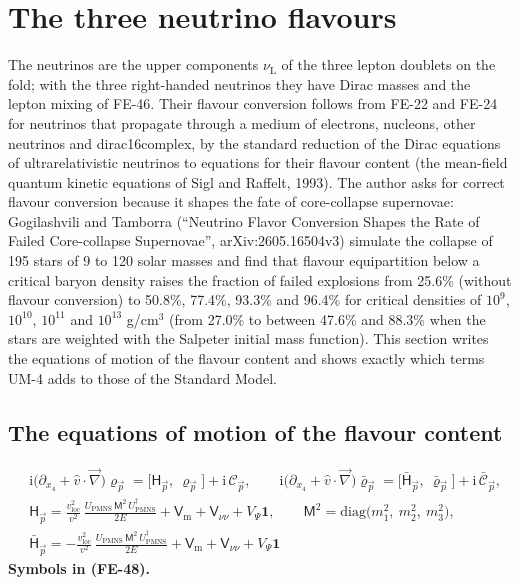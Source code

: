 \documentclass[
  10pt,
]{article}
\begin{document}
\hypertarget{the-three-neutrino-flavours}{%
\section{The three neutrino
flavours}\label{the-three-neutrino-flavours}}

The neutrinos are the upper components \(\nu_{\mathrm{L}}\) of the three
lepton doublets on the fold; with the three right-handed neutrinos they
have Dirac masses and the lepton mixing of FE-46. Their flavour
conversion follows from FE-22 and FE-24 for neutrinos that propagate
through a medium of electrons, nucleons, other neutrinos and
dirac16complex, by the standard reduction of the Dirac equations of
ultrarelativistic neutrinos to equations for their flavour content (the
mean-field quantum kinetic equations of Sigl and Raffelt, 1993). The
author asks for correct flavour conversion because it shapes the fate of
core-collapse supernovae: Gogilashvili and Tamborra (``Neutrino Flavor
Conversion Shapes the Rate of Failed Core-collapse Supernovae'',
arXiv:2605.16504v3) simulate the collapse of 195 stars of 9 to 120 solar
masses and find that flavour equipartition below a critical baryon
density raises the fraction of failed explosions from 25.6\% (without
flavour conversion) to 50.8\%, 77.4\%, 93.3\% and 96.4\% for critical
densities of \(10^9\), \(10^{10}\), \(10^{11}\) and \(10^{13}\)
g/cm\(^3\) (from 27.0\% to between 47.6\% and 88.3\% when the stars are
weighted with the Salpeter initial mass function). This section writes
the equations of motion of the flavour content and shows exactly which
terms UM-4 adds to those of the Standard Model.

\hypertarget{the-equations-of-motion-of-the-flavour-content}{%
\subsection{The equations of motion of the flavour
content}\label{the-equations-of-motion-of-the-flavour-content}}

\[
\begin{aligned}
&\mathrm{i}\big(\partial_{x_4} + \hat v\cdot\vec\nabla\big)\varrho_{\vec p} = \big[\mathsf{H}_{\vec p},\ \varrho_{\vec p}\big] + \mathrm{i}\,\mathcal{C}_{\vec p},\qquad
 \mathrm{i}\big(\partial_{x_4} + \hat v\cdot\vec\nabla\big)\bar\varrho_{\vec p} = \big[\bar{\mathsf{H}}_{\vec p},\ \bar\varrho_{\vec p}\big] + \mathrm{i}\,\bar{\mathcal{C}}_{\vec p},\\
&\mathsf{H}_{\vec p} = \frac{v_{\mathrm{loc}}^2}{v^2}\,\frac{U_{\mathrm{PMNS}}\,\mathsf{M}^2\,U_{\mathrm{PMNS}}^\dagger}{2E} + \mathsf{V}_{\mathrm{m}} + \mathsf{V}_{\nu\nu} + V_\Psi\mathbf{1},\qquad
 \mathsf{M}^2 = \mathrm{diag}\big(m_1^2,\ m_2^2,\ m_3^2\big),\\
&\bar{\mathsf{H}}_{\vec p} = -\frac{v_{\mathrm{loc}}^2}{v^2}\,\frac{U_{\mathrm{PMNS}}\,\mathsf{M}^2\,U_{\mathrm{PMNS}}^\dagger}{2E} + \mathsf{V}_{\mathrm{m}} + \mathsf{V}_{\nu\nu} + V_\Psi\mathbf{1}
\end{aligned} \tag{FE-48}
\] \textbf{Symbols in (FE-48).}
\end{document}
